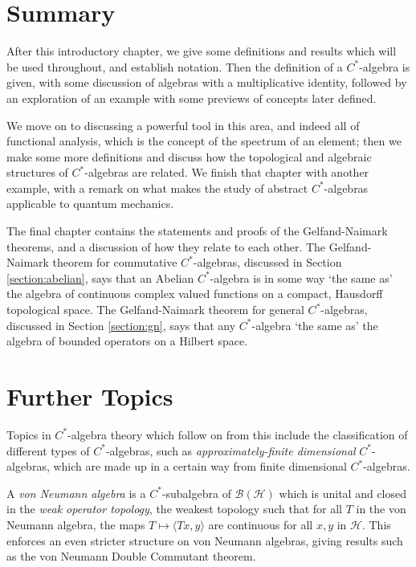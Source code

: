 \documentclass[11pt,a4paper]{report}
\theoremstyle{plain}
\theoremstyle{definition}
\newcommand{\1}{\mathbbm{1}}
\renewcommand{\H}{\mathcal{H}}
\newcommand{\B}{\mathcal{B}}
\newcommand{\BH}{\mathcal{\B(\H)}}
\begin{document}
\section{Summary}

After this introductory chapter, we give some definitions and results which will 
be used throughout, and establish notation. Then the definition of a 
$C^\ast$-algebra is given, with some discussion of algebras with a 
multiplicative identity, followed by an exploration of an example with some 
previews of concepts later defined. 

We move on to discussing a powerful tool in 
this area, and indeed all of functional analysis, which is the concept of the 
spectrum of an element; then we make some more definitions and discuss how the 
topological and algebraic structures of $C^\ast$-algebras are related. 
We finish that chapter with another example, with a remark on what makes the 
study of abstract $C^\ast$-algebras applicable to quantum mechanics. 

The final chapter contains the statements and proofs of the Gelfand-Naimark 
theorems, and a discussion of how they relate to each other. The Gelfand-Naimark 
theorem for commutative $C^\ast$-algebras, discussed in Section 
\ref{section:abelian}, says that an Abelian $C^\ast$-algebra is in some way `the 
same as' the algebra of continuous complex valued functions on a compact, 
Hausdorff topological space. The Gelfand-Naimark theorem for general 
$C^\ast$-algebras, discussed in Section \ref{section:gn}, says that any 
$C^\ast$-algebra `the same as' the algebra of bounded operators on a Hilbert 
space.





\section{Further Topics}
Topics in $C^\ast$-algebra theory which follow on from this include the 
classification of different types of $C^\ast$-algebras, such as 
\emph{approximately-finite dimensional} $C^\ast$-algebras, which are made up in 
a certain way from finite dimensional $C^\ast$-algebras.


A \emph{von Neumann algebra }is a $C^\ast$-subalgebra of $\BH$ which is unital 
and closed in the \emph{weak operator topology}, the weakest topology such that
for all $T$ in the von Neumann algebra, the maps $T\mapsto\langle Tx,y\rangle$ 
are continuous for all $x,y$ in $\H$. This enforces an even stricter structure 
on von Neumann algebras, giving results such as the von Neumann Double 
Commutant theorem.
\end{document}
